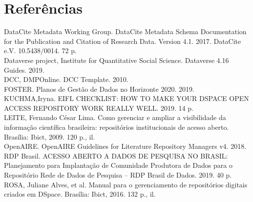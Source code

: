 \documentclass[12pt,hidelinks]{article}
\begin{document}
\newpage

\section{Referências}

\vspace{10.5cm}

DataCite Metadata Working Group. DataCite Metadata Schema Documentation for the
Publication and Citation of Research Data. Version 4.1. 2017. DataCite e.V. 10.5438/0014. 72 p.\\

\noindent Dataverse project,  Institute for Quantitative Social Science. Dataverse 4.16 Guides. 2019.\\

\noindent DCC, DMPOnline. DCC Template. 2010.\\

\noindent FOSTER. Planos de Gestão de Dados no Horizonte 2020. 2019.\\

\noindent KUCHMA,Iryna. EIFL CHECKLIST: HOW TO MAKE YOUR DSPACE OPEN ACCESS REPOSITORY WORK REALLY WELL. 2019. 14 p.\\

\noindent LEITE, Fernando César Lima. Como gerenciar e ampliar a visibilidade da informação científica brasileira: repositórios institucionais de acesso aberto. Brasília: Ibict, 2009. 120 p., il.\\

\noindent OpenAIRE. OpenAIRE Guidelines for Literature Repository Managers v4. 2018.\\

\noindent RDP Brasil. ACESSO ABERTO A DADOS
DE PESQUISA NO BRASIL: Planejamento para Implantação de Comunidade Produtora de
Dados para o Repositório Rede de Dados de Pesquisa – RDP Brasil de Dados. 2019. 40 p.\\

\noindent ROSA, Juliane Alves, et al. Manual para o gerenciamento de repositórios digitais criados em DSpace. Brasília: Ibict, 2016. 132 p., il.\\
\end{document}
